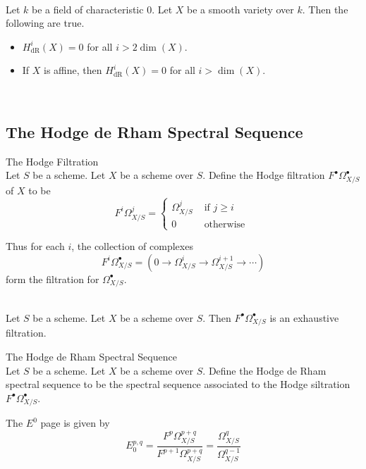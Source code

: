 \documentclass[a4paper]{article}
\begin{document}
\begin{lmm}{}{}\\
Let $k$ be a field of characteristic $0$. Let $X$ be a smooth variety over $k$. Then the following are true. 
\begin{itemize}
\item $H_\text{dR}^i(X)=0$ for all $i>2\dim(X)$. 
\item If $X$ is affine, then $H_\text{dR}^i(X)=0$ for all $i>\dim(X)$. 
\end{itemize}
\end{lmm}

\begin{prp}{}{}\\

\end{prp}

\subsection{The Hodge de Rham Spectral Sequence}
\begin{defn}{The Hodge Filtration}{}\\
Let $S$ be a scheme. Let $X$ be a scheme over $S$. Define the Hodge filtration $F^\bullet\Omega_{X/S}^\bullet$ of $X$ to be $$F^i\Omega_{X/S}^j=\begin{cases}
\Omega_{X/S}^j & \text{ if }j\geq i\\
0 & \text{ otherwise }
\end{cases}$$
\end{defn}

Thus for each $i$, the collection of complexes $$F^i\Omega_{X/S}^\bullet=(0\to\Omega_{X/S}^i\to\Omega_{X/S}^{i+1}\to\cdots)$$ form the filtration for $\Omega_{X/S}^\bullet$. 

\begin{lmm}{}{}\\
Let $S$ be a scheme. Let $X$ be a scheme over $S$. Then $F^\bullet\Omega_{X/S}^\bullet$ is an exhaustive filtration. 
\end{lmm}

\begin{defn}{The Hodge de Rham Spectral Sequence}{}\\
Let $S$ be a scheme. Let $X$ be a scheme over $S$. Define the Hodge de Rham spectral sequence to be the spectral sequence associated to the Hodge siltration $F^\bullet\Omega_{X/S}^\bullet$. 
\end{defn}

The $E^0$ page is given by $$E_0^{p,q}=\frac{F^p\Omega_{X/S}^{p+q}}{F^{p+1}\Omega_{X/S}^{p+q}}=\frac{\Omega_{X/S}^q}{\Omega_{X/S}^{q-1}}$$
\end{document}
